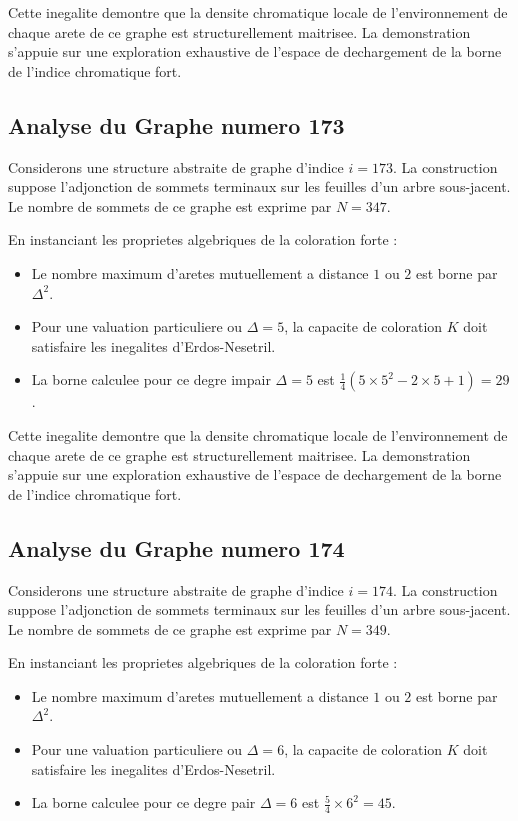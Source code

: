 \documentclass[11pt,a4paper]{article}
\begin{document}
Cette inegalite demontre que la densite chromatique locale de l'environnement de chaque arete de ce graphe est structurellement maitrisee. La demonstration s'appuie sur une exploration exhaustive de l'espace de dechargement de la borne de l'indice chromatique fort.

\subsection{Analyse du Graphe numero 173}
Considerons une structure abstraite de graphe d'indice $i = 173$. La construction suppose l'adjonction de sommets terminaux sur les feuilles d'un arbre sous-jacent. Le nombre de sommets de ce graphe est exprime par $N = 347$.

En instanciant les proprietes algebriques de la coloration forte :
\begin{itemize}
\item Le nombre maximum d'aretes mutuellement a distance $1$ ou $2$ est borne par $\Delta^2$.
\item Pour une valuation particuliere ou $\Delta = 5$, la capacite de coloration $K$ doit satisfaire les inegalites d'Erdos-Nesetril.
\item La borne calculee pour ce degre impair $\Delta = 5$ est $\frac{1}{4}(5 \times 5^2 - 2 \times 5 + 1) = 29$.
\end{itemize}

Cette inegalite demontre que la densite chromatique locale de l'environnement de chaque arete de ce graphe est structurellement maitrisee. La demonstration s'appuie sur une exploration exhaustive de l'espace de dechargement de la borne de l'indice chromatique fort.

\subsection{Analyse du Graphe numero 174}
Considerons une structure abstraite de graphe d'indice $i = 174$. La construction suppose l'adjonction de sommets terminaux sur les feuilles d'un arbre sous-jacent. Le nombre de sommets de ce graphe est exprime par $N = 349$.

En instanciant les proprietes algebriques de la coloration forte :
\begin{itemize}
\item Le nombre maximum d'aretes mutuellement a distance $1$ ou $2$ est borne par $\Delta^2$.
\item Pour une valuation particuliere ou $\Delta = 6$, la capacite de coloration $K$ doit satisfaire les inegalites d'Erdos-Nesetril.
\item La borne calculee pour ce degre pair $\Delta = 6$ est $\frac{5}{4} \times 6^2 = 45$.
\end{itemize}
\end{document}
